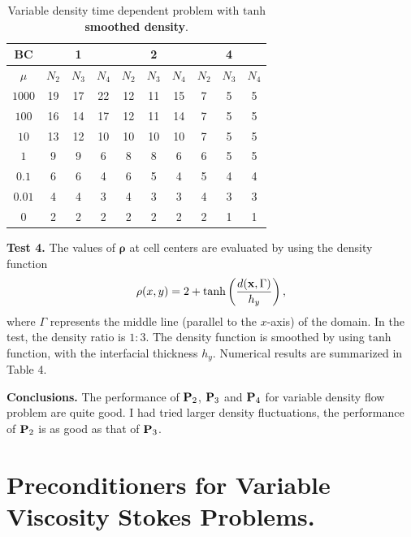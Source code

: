 \documentclass[9pt]{article}
\newcommand{\V}[1]{\boldsymbol{#1}}
\begin{document}
\begin{table}[h]
\begin{center}
\begin{tabular}{|c||ccc|ccc|ccc|}
\hline
 BC        &    &1    &      &     &2    &    &      &4     & \\
\hline
$\mu$   &$N_2$ &$N_3$ &$N_4$  &$N_2$ &$N_3$  &$N_4$  &$N_2$  &$N_3$  &$N_4$ \\
\hline
\hline
$1000$   &19   &17   &22     &12  &11  &15      &7  &5  &5 \\
\hline
$100$    &16   &14   &17     &12  &11  &14      &7  &5  &5 \\
\hline
$10$     &13   &12   &10     &10  &10  &10      &7  &5  &5 \\
\hline
$1$       &9    &9   &6      &8   &8   &6       &6  &5  &5 \\
\hline
$0.1$     &6    &6   &4      &6    &5    &4         &5  &4  &4 \\
\hline
$0.01$    &4    &4   &3      &4    &3    &3         &4  &3  &3 \\
\hline
$0$       &2    &2   &2      &2    &2    &2         &2  &1  &1 \\
\hline
\end{tabular}
\vspace{2mm} \caption{Variable density time dependent problem with {\bf $\mbox{tanh}$ smoothed density}.
}
\end{center}
\end{table}

{\bf Test 4.} The values of $\V{\rho}$ at cell centers are evaluated by using the density function
$$
\rho(x, y) = 2+\mbox{tanh}\left(\frac{d({\bf x}, \Gamma)}{h_y} \right),
$$
where $\Gamma$ represents the middle line (parallel to the $x$-axis) of the domain.
In the test, the density ratio is $1:3$. The density function is smoothed by using $\mbox{tanh}$ function, with the interfacial thickness $h_y$. Numerical results are summarized in Table 4.

{\bf Conclusions.} The performance of ${\bf P}_2$, ${\bf P}_3$ and ${\bf P}_4$ for variable density flow problem are quite good. I had tried larger density fluctuations, the performance of ${\bf P}_2$ is as good as that of ${\bf P}_3$.

\section{Preconditioners for Variable Viscosity Stokes Problems.}
\end{document}
